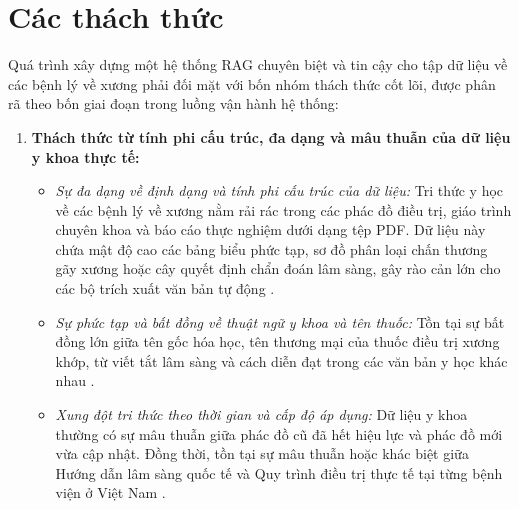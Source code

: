 \section{Các thách thức}

Quá trình xây dựng một hệ thống RAG chuyên biệt và tin cậy cho tập dữ liệu về các bệnh lý về xương phải đối mặt với bốn nhóm thách thức cốt lõi, được phân rã theo bốn giai đoạn trong luồng vận hành hệ thống:

\begin{enumerate}[label=(\arabic*)]
    \item \textbf{Thách thức từ tính phi cấu trúc, đa dạng và mâu thuẫn của dữ liệu y khoa thực tế:}
    \begin{itemize}
        \item \textit{Sự đa dạng về định dạng và tính phi cấu trúc của dữ liệu:} Tri thức y học về các bệnh lý về xương nằm rải rác trong các phác đồ điều trị, giáo trình chuyên khoa và báo cáo thực nghiệm dưới dạng tệp PDF. Dữ liệu này chứa mật độ cao các bảng biểu phức tạp, sơ đồ phân loại chấn thương gãy xương hoặc cây quyết định chẩn đoán lâm sàng, gây rào cản lớn cho các bộ trích xuất văn bản tự động \cite{collaco2026}.
        \item \textit{Sự phức tạp và bất đồng về thuật ngữ y khoa và tên thuốc:} Tồn tại sự bất đồng lớn giữa tên gốc hóa học, tên thương mại của thuốc điều trị xương khớp, từ viết tắt lâm sàng và cách diễn đạt trong các văn bản y học khác nhau \cite{medrag2024}.
        \item \textit{Xung đột tri thức theo thời gian và cấp độ áp dụng:} Dữ liệu y khoa thường có sự mâu thuẫn giữa phác đồ cũ đã hết hiệu lực và phác đồ mới vừa cập nhật. Đồng thời, tồn tại sự mâu thuẫn hoặc khác biệt giữa Hướng dẫn lâm sàng quốc tế và Quy trình điều trị thực tế tại từng bệnh viện ở Việt Nam \cite{xiong2024mirage}.
    \end{itemize}


\end{enumerate}
